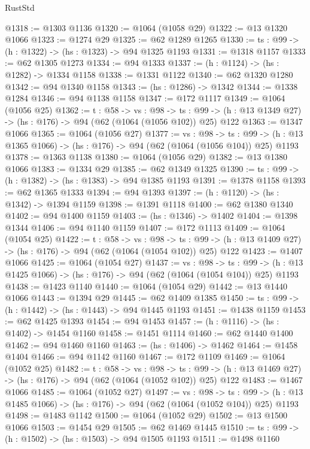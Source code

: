 \begin{lexlean}{RustStd}
\begin{coremodule}
{\begin{coremodule}
{{{{{{@1318 := @1303 @1136
@1320 := @1064 (@1058 @29)
@1322 := @13 @1320 @1066
@1323 := @1274 @29
@1325 := @62 @1289 @1265
@1330 := {ts : @99} -> (h : @1322) -> (hs : @1323) -> @94 @1325 @1193
@1331 := @1318 @1157
@1333 := @62 @1305 @1273
@1334 := @94 @1333
@1337 := (h : @1124) -> (hs : @1282) -> @1334 @1158
@1338 := @1331 @1122
@1340 := @62 @1320 @1280
@1342 := @94 @1340 @1158
@1343 := (hs : @1286) -> @1342
@1344 := @1338 @1284
@1346 := @94 @1138 @1158
@1347 := @172 @1117
@1349 := @1064 (@1056 @25)
@1362 := {t : @58} ->
  {vs : @98} ->
  {ts : @99} -> (h : @13 @1349 @27) -> (hs : @176) -> @94 (@62 (@1064 (@1056 @102)) @25) @122
@1363 := @1347 @1066
@1365 := @1064 (@1056 @27)
@1377 := {vs : @98} ->
  {ts : @99} -> (h : @13 @1365 @1066) -> (hs : @176) -> @94 (@62 (@1064 (@1056 @104)) @25) @1193
@1378 := @1363 @1138
@1380 := @1064 (@1056 @29)
@1382 := @13 @1380 @1066
@1383 := @1334 @29
@1385 := @62 @1349 @1325
@1390 := {ts : @99} -> (h : @1382) -> (hs : @1383) -> @94 @1385 @1193
@1391 := @1378 @1158
@1393 := @62 @1365 @1333
@1394 := @94 @1393
@1397 := (h : @1120) -> (hs : @1342) -> @1394 @1159
@1398 := @1391 @1118
@1400 := @62 @1380 @1340
@1402 := @94 @1400 @1159
@1403 := (hs : @1346) -> @1402
@1404 := @1398 @1344
@1406 := @94 @1140 @1159
@1407 := @172 @1113
@1409 := @1064 (@1054 @25)
@1422 := {t : @58} ->
  {vs : @98} ->
  {ts : @99} -> (h : @13 @1409 @27) -> (hs : @176) -> @94 (@62 (@1064 (@1054 @102)) @25) @122
@1423 := @1407 @1066
@1425 := @1064 (@1054 @27)
@1437 := {vs : @98} ->
  {ts : @99} -> (h : @13 @1425 @1066) -> (hs : @176) -> @94 (@62 (@1064 (@1054 @104)) @25) @1193
@1438 := @1423 @1140
@1440 := @1064 (@1054 @29)
@1442 := @13 @1440 @1066
@1443 := @1394 @29
@1445 := @62 @1409 @1385
@1450 := {ts : @99} -> (h : @1442) -> (hs : @1443) -> @94 @1445 @1193
@1451 := @1438 @1159
@1453 := @62 @1425 @1393
@1454 := @94 @1453
@1457 := (h : @1116) -> (hs : @1402) -> @1454 @1160
@1458 := @1451 @1114
@1460 := @62 @1440 @1400
@1462 := @94 @1460 @1160
@1463 := (hs : @1406) -> @1462
@1464 := @1458 @1404
@1466 := @94 @1142 @1160
@1467 := @172 @1109
@1469 := @1064 (@1052 @25)
@1482 := {t : @58} ->
  {vs : @98} ->
  {ts : @99} -> (h : @13 @1469 @27) -> (hs : @176) -> @94 (@62 (@1064 (@1052 @102)) @25) @122
@1483 := @1467 @1066
@1485 := @1064 (@1052 @27)
@1497 := {vs : @98} ->
  {ts : @99} -> (h : @13 @1485 @1066) -> (hs : @176) -> @94 (@62 (@1064 (@1052 @104)) @25) @1193
@1498 := @1483 @1142
@1500 := @1064 (@1052 @29)
@1502 := @13 @1500 @1066
@1503 := @1454 @29
@1505 := @62 @1469 @1445
@1510 := {ts : @99} -> (h : @1502) -> (hs : @1503) -> @94 @1505 @1193
@1511 := @1498 @1160
}}}}}}
\end{coremodule}}
\end{coremodule}
\end{lexlean}
